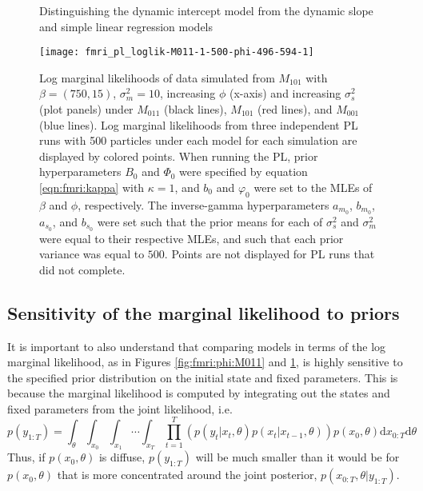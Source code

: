 \begin{figure}
\ssp
\centering
\caption{Distinguishing the dynamic intercept model from the dynamic slope and simple linear regression models} \label{fig:fmri:phi:M101}
\texttt{[image: fmri\_pl\_loglik-M011-1-500-phi-496-594-1]}
\caption*{Log marginal likelihoods of data simulated from $M_{101}$ with $\beta=(750,15)$, $\sigma^2_m = 10$, increasing $\phi$ (x-axis) and increasing $\sigma^2_s$ (plot panels) under $M_{011}$ (black lines), $M_{101}$ (red lines), and $M_{001}$ (blue lines). Log marginal likelihoods from three independent PL runs with 500 particles under each model for each simulation are displayed by colored points. When running the PL, prior hyperparameters $B_0$ and $\Phi_0$ were specified by equation \eqref{eqn:fmri:kappa} with $\kappa = 1$, and $b_0$ and $\varphi_0$ were set to the MLEs of $\beta$ and $\phi$, respectively. The inverse-gamma hyperparameters $a_{m_0}$, $b_{m_0}$, $a_{s_0}$, and $b_{s_0}$ were set such that the prior means for each of $\sigma^2_s$ and $\sigma^2_m$ were equal to their respective MLEs, and such that each prior variance was equal to $500$. Points are not displayed for PL runs that did not complete.}
\end{figure}

\subsection{Sensitivity of the marginal likelihood to priors \label{sec:fmri:kappa}}

It is important to also understand that comparing models in terms of the log marginal likelihood, as in Figures \ref{fig:fmri:phi:M011} and \ref{fig:fmri:phi:M101}, is highly sensitive to the specified prior distribution on the initial state and fixed parameters. This is because the marginal likelihood is computed by integrating out the states and fixed parameters from the joint likelihood, i.e.
\begin{equation}
p(y_{1:T}) = \int_{\theta} \int_{x_0} \int_{x_1} \cdots \int_{x_T} \prod_{t=1}^T\left(p(y_t|x_t,\theta)p(x_t|x_{t-1},\theta)\right)p(x_0,\theta)\mbox{d}x_{0:T}\mbox{d}\theta \label{eqn:int:marg}
\end{equation}
Thus, if $p(x_0,\theta)$ is diffuse, $p(y_{1:T})$ will be much smaller than it would be for $p(x_0,\theta)$ that is more concentrated around the joint posterior, $p(x_{0:T},\theta|y_{1:T})$.

